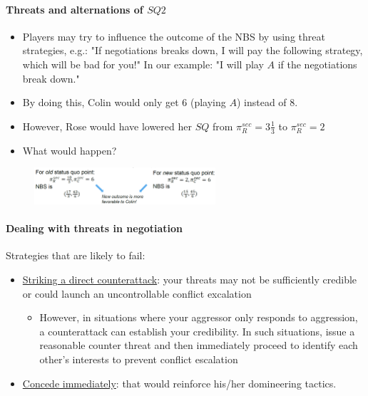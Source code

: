 \paragraph{Threats and alternations of $SQ2$}
\begin{itemize}
    \item Players may try to influence the outcome of the NBS by using threat
        strategies, e.g.: "If negotiations breaks down, I will pay the following
        strategy, which will be bad for you!" In our example: "I will play $A$
        if the negotiations break down."
    \item By doing this, Colin would only get $6$ (playing $A$) instead of $8$.
    \item However, Rose would have lowered her $SQ$ from $\pi_R^{sec} = 3 \frac{1}{3}$
        to $\pi_R^{sec} = 2$
    \item What would happen?
\end{itemize}
\begin{figure}[H]
    \centering
    \includegraphics[width=0.6\textwidth]{Pictures/rose_colin_new_SQpng.png}
\end{figure}

\vspace{1\baselineskip}

\paragraph{Dealing with threats in negotiation}

Strategies that are likely to fail:
\begin{itemize}
    \item \underline{Striking a direct counterattack}: your threats may not
        be sufficiently credible or could launch an uncontrollable conflict excalation
        \begin{itemize}
            \item However, in situations where your aggressor only responds to
                aggression, a counterattack can establish your credibility. In such
                situations, issue a reasonable counter threat and then immediately
                proceed to identify each other's interests to prevent conflict
                escalation
        \end{itemize}
    \item \underline{Concede immediately}: that would reinforce his/her domineering
        tactics.
\end{itemize}

